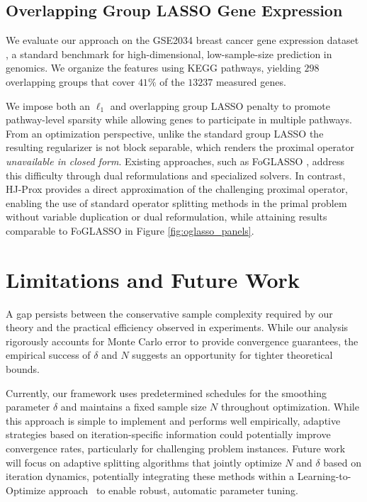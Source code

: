 \documentclass{article}
\theoremstyle{plain}
\theoremstyle{definition}
\theoremstyle{remark}
\begin{document}
\subsection{Overlapping Group LASSO Gene Expression}

We evaluate our approach on the GSE2034 breast cancer gene expression dataset \cite{WangEtAl2005Lancet}, a standard benchmark for high-dimensional, low-sample-size prediction in genomics. We organize the features using KEGG pathways, yielding $298$ overlapping groups that cover  $41\%$ of the $13237$ measured genes.

We impose both an $\ell_1$ and overlapping group LASSO penalty to promote pathway-level sparsity while allowing genes to participate in multiple pathways. From an optimization perspective, unlike the standard group LASSO the resulting regularizer is not block separable, which renders the proximal operator \emph{unavailable in closed form}. Existing approaches, such as FoGLASSO \cite{YuanLiuYe2011}, address this difficulty through dual reformulations and specialized solvers. In contrast, HJ-Prox provides a direct approximation of the challenging proximal operator, enabling the use of standard operator splitting methods in the primal problem without variable duplication or dual reformulation, while attaining results comparable to FoGLASSO in Figure \ref{fig:oglasso_panels}.

\section{Limitations and Future Work}

A gap persists between the conservative sample complexity required by our theory and the practical efficiency observed in experiments. While our analysis rigorously accounts for Monte Carlo error to provide convergence guarantees, the empirical success of $\delta$ and $N$ suggests an opportunity for tighter theoretical bounds.

Currently, our framework uses predetermined schedules for the smoothing parameter $\delta$ and maintains a fixed sample size $N$ throughout optimization. While this approach is simple to implement and performs well empirically, adaptive strategies based on iteration-specific information could potentially improve convergence rates, particularly for challenging problem instances. Future work will focus on adaptive splitting algorithms that jointly optimize $N$ and $\delta$ based on iteration dynamics, potentially integrating these methods within a Learning-to-Optimize approach~\cite{chen2022learning, heaton2023explainable, mckenzie2024three, mckenziedifferentiating} to enable robust, automatic parameter tuning. 
\end{document}
